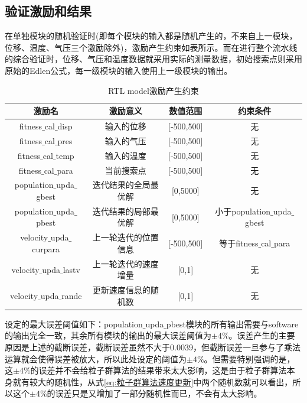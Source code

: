 \subsection{验证激励和结果}
在单独模块的随机验证时(即每个模块的输入都是随机产生的，不来自上一模块，位移、温度、气压三个激励除外)，激励产生约束如表所示。而在进行整个流水线的综合验证时，位移、气压和温度数据就采用实际的测量数据，初始搜索点则采用原始的Edlen公式，每一级模块的输入使用上一级模块的输出。
\begin{table}[H]
  \centering
  \caption{RTL model激励产生约束}
  \label{tab:RTL model激励产生约束}
  \begin{tabular}{c|c|c|c}
      \hline
      激励名                             & 激励意义                   &  数值范围       & 约束条件  \\ \hline
      fitness$\_$cal$\_$disp            & 输入的位移                  &  [-500,500]     & 无      \\ \hline
      fitness$\_$cal$\_$pres            & 输入的气压                  &  [-500,500]     & 无      \\ \hline
      fitness$\_$cal$\_$temp            & 输入的温度                  &  [-500,500]     & 无      \\ \hline
      fitness$\_$cal$\_$para            & 当前搜索点                  &  [-500,500]     & 无      \\ \hline
      population$\_$upda$\_$gbest       & 迭代结果的全局最优解         &  [0,5000]       & 无       \\ \hline
      population$\_$upda$\_$pbest       & 迭代结果的局部最优解         &  [0,5000]       &小于population$\_$upda$\_$gbest \\ \hline
      velocity$\_$upda$\_$curpara       & 上一轮迭代的位置信息         & [-500,500]      & 等于fitness$\_$cal$\_$para     \\ \hline
      velocity$\_$upda$\_$lastv         & 上一轮迭代的速度增量         & [0,1]           & 无     \\ \hline
      velocity$\_$upda$\_$randc         & 更新速度信息的随机数         & [0,1]           & 无     \\ \hline
  \end{tabular}
\end{table}

设定的最大误差阈值如下：population$\_$upda$\_$pbest模块的所有输出需要与software的输出完全一致，其余所有模块的输出的最大误差阈值为$\pm4\%$。误差产生的主要原因是上述的截断误差，截断误差虽然不大于0.0039，但截断误差一旦参与了乘法运算就会使得误差被放大，所以此处设定的阈值为$\pm4\%$。但需要特别强调的是，这$\pm4\%$的误差并不会给粒子群算法的结果带来太大影响，这是由于粒子群算法本身就有较大的随机性，从式\eqref{eq:粒子群算法速度更新}中两个随机数就可以看出，所以这个$\pm4\%$的误差只是又增加了一部分随机性而已，不会有太大影响。

